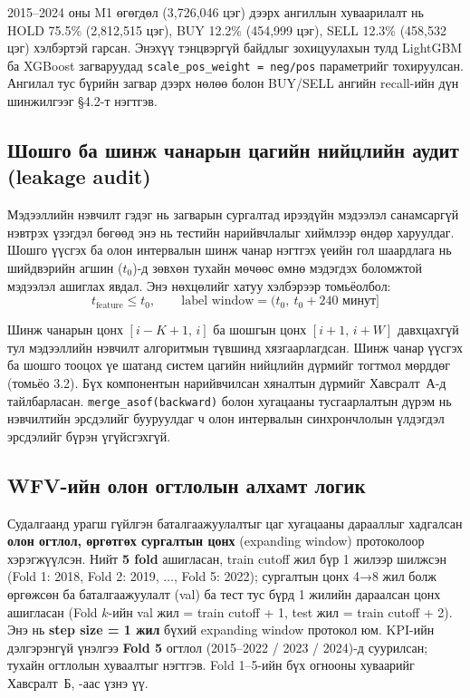 2015--2024 оны M1 өгөгдөл (3{,}726{,}046 цэг) дээрх ангиллын хуваарилалт нь HOLD 75.5\% (2{,}812{,}515 цэг), BUY 12.2\% (454{,}999 цэг), SELL 12.3\% (458{,}532 цэг) хэлбэртэй гарсан. Энэхүү тэнцвэргүй байдлыг зохицуулахын тулд LightGBM ба XGBoost загваруудад \texttt{scale\_pos\_weight = neg/pos} параметрийг тохируулсан. Ангилал тус бүрийн загвар дээрх нөлөө болон BUY/SELL ангийн recall-ийн дүн шинжилгээг §4.2-т нэгтгэв.

\subsection{Шошго ба шинж чанарын цагийн нийцлийн аудит (leakage audit)}

Мэдээллийн нэвчилт гэдэг нь загварын сургалтад ирээдүйн мэдээлэл санамсаргүй нэвтрэх үзэгдэл бөгөөд энэ нь тестийн нарийвчлалыг хиймлээр өндөр харуулдаг. Шошго үүсгэх ба олон интервалын шинж чанар нэгтгэх үеийн гол шаардлага нь шийдвэрийн агшин ($t_0$)-д зөвхөн тухайн мөчөөс өмнө мэдэгдэх боломжтой мэдээлэл ашиглах явдал. Энэ нөхцөлийг хатуу хэлбэрээр томьёолбол:
\begin{equation}
t_{\text{feature}} \le t_0, \qquad \text{label window} = (t_0,\ t_0 + 240\text{ минут}]
\end{equation}

Шинж чанарын цонх $[i-K+1,\,i]$ ба шошгын цонх $[i+1,\,i+W]$ давхцахгүй тул мэдээллийн нэвчилт алгоритмын түвшинд хязгаарлагдсан. Шинж чанар үүсгэх ба шошго тооцох үе шатанд систем цагийн нийцлийн дүрмийг тогтмол мөрддөг (томьёо 3.2). Бүх компонентын нарийвчилсан хяналтын дүрмийг Хавсралт~А-д тайлбарласан. \texttt{merge\_asof(backward)} болон хугацааны тусгаарлалтын дүрэм нь нэвчилтийн эрсдэлийг бууруулдаг ч олон интервалын синхрончлолын үлдэгдэл эрсдэлийг бүрэн үгүйсгэхгүй.

\subsection{WFV-ийн олон огтлолын алхамт логик}
\label{subsec:wfv_logic}

Судалгаанд урагш гүйлгэн баталгаажуулалтыг цаг хугацааны дарааллыг хадгалсан \textbf{олон огтлол, өргөтгөх сургалтын цонх} (expanding window) протоколоор хэрэгжүүлсэн. Нийт \textbf{5 fold} ашигласан, train cutoff жил бүр 1 жилээр шилжсэн (Fold 1: 2018, Fold 2: 2019, $\ldots$, Fold 5: 2022); сургалтын цонх 4→8 жил болж өргөжсөн ба баталгаажуулалт (val) ба тест тус бүрд 1 жилийн дараалсан цонх ашигласан (Fold $k$-ийн val жил = train cutoff + 1, test жил = train cutoff + 2). Энэ нь \textbf{step size = 1 жил} бүхий expanding window протокол юм. KPI-ийн дэлгэрэнгүй үнэлгээ \textbf{Fold 5} огтлол (2015--2022 / 2023 / 2024)-д суурилсан;  тухайн огтлолын хуваалтыг нэгтгэв. Fold 1--5-ийн бүх огнооны хуваарийг Хавсралт~Б, -аас үзнэ үү.

